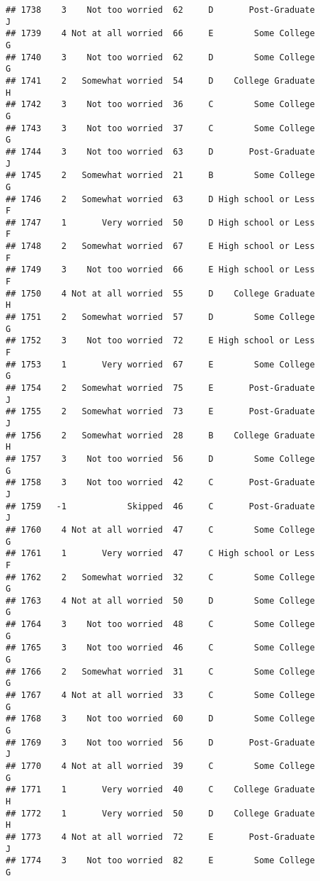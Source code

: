 \documentclass[
]{article}
\begin{document}
\begin{verbatim}
## 1738    3    Not too worried  62     D       Post-Graduate         J
## 1739    4 Not at all worried  66     E        Some College         G
## 1740    3    Not too worried  62     D        Some College         G
## 1741    2   Somewhat worried  54     D    College Graduate         H
## 1742    3    Not too worried  36     C        Some College         G
## 1743    3    Not too worried  37     C        Some College         G
## 1744    3    Not too worried  63     D       Post-Graduate         J
## 1745    2   Somewhat worried  21     B        Some College         G
## 1746    2   Somewhat worried  63     D High school or Less         F
## 1747    1       Very worried  50     D High school or Less         F
## 1748    2   Somewhat worried  67     E High school or Less         F
## 1749    3    Not too worried  66     E High school or Less         F
## 1750    4 Not at all worried  55     D    College Graduate         H
## 1751    2   Somewhat worried  57     D        Some College         G
## 1752    3    Not too worried  72     E High school or Less         F
## 1753    1       Very worried  67     E        Some College         G
## 1754    2   Somewhat worried  75     E       Post-Graduate         J
## 1755    2   Somewhat worried  73     E       Post-Graduate         J
## 1756    2   Somewhat worried  28     B    College Graduate         H
## 1757    3    Not too worried  56     D        Some College         G
## 1758    3    Not too worried  42     C       Post-Graduate         J
## 1759   -1            Skipped  46     C       Post-Graduate         J
## 1760    4 Not at all worried  47     C        Some College         G
## 1761    1       Very worried  47     C High school or Less         F
## 1762    2   Somewhat worried  32     C        Some College         G
## 1763    4 Not at all worried  50     D        Some College         G
## 1764    3    Not too worried  48     C        Some College         G
## 1765    3    Not too worried  46     C        Some College         G
## 1766    2   Somewhat worried  31     C        Some College         G
## 1767    4 Not at all worried  33     C        Some College         G
## 1768    3    Not too worried  60     D        Some College         G
## 1769    3    Not too worried  56     D       Post-Graduate         J
## 1770    4 Not at all worried  39     C        Some College         G
## 1771    1       Very worried  40     C    College Graduate         H
## 1772    1       Very worried  50     D    College Graduate         H
## 1773    4 Not at all worried  72     E       Post-Graduate         J
## 1774    3    Not too worried  82     E        Some College         G

\end{verbatim}
\end{document}

